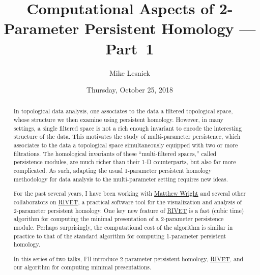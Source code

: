 \documentclass{UAmathtalk}
\author{Mike Lesnick}
\title{Computational Aspects of 2-Parameter Persistent Homology --- Part~1}
\date{Thursday, October 25, 2018}
\begin{document}
\maketitle

\begin{abstract}
In topological data analysis, one associates to the data a filtered topological space, whose structure we then examine using persistent homology. However, in many settings, a single filtered space is not a rich enough invariant to encode the interesting structure of the data. This motivates the study of multi-parameter persistence, which associates to the data a topological space simultaneously equipped with two or more filtrations. The homological invariants of these ``multi-filtered spaces,'' called persistence modules, are much richer than their 1-D counterparts, but also far more complicated. As such, adapting the usual 1-parameter persistent homology methodology for data analysis to the multi-parameter setting requires new ideas.

For the past several years, I have been working with \href{http://www.mlwright.org}{Matthew Wright} and several other collaborators on \href{http://rivet.online}{RIVET}, a practical software tool for the visualization and analysis of 2-parameter persistent homology. One key new feature of \href{http://rivet.online}{RIVET} is a fast (cubic time) algorithm for computing the minimal presentation of a 2-parameter persistence module. Perhaps surprisingly, the computational cost of the algorithm is similar in practice to that of the standard algorithm for computing 1-parameter persistent homology.

In this series of two talks, I'll introduce 2-parameter persistent homology, \href{http://rivet.online}{RIVET}, and our algorithm for computing minimal presentations.
\end{abstract}
\end{document}

